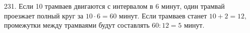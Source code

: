 231. Если 10 трамваев двигаются с интервалом в 6 минут, один трамвай проезжает полный круг за $10\cdot6=60$ минут. Если трамваев станет $10+2=12,$ промежутки между трамваями будут составлять $60:12=5$ минут.\\
